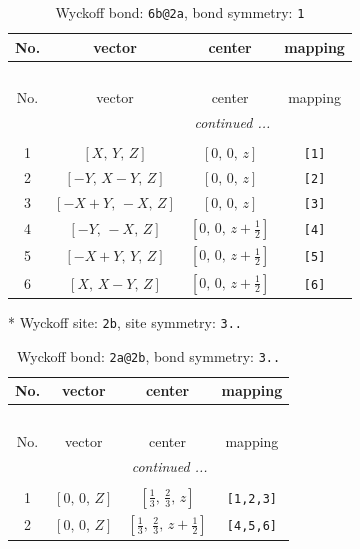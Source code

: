 \documentclass[fleqn,8pt]{jsarticle}
\begin{document}
\begin{longtable}{cccc}
\caption{Wyckoff bond: {\tt 6b@2a}, bond symmetry: {\tt 1}}
 \\
 \hline \hline
No. & vector & center & mapping \\ \hline \endfirsthead

\multicolumn{3}{l}{\tablename\ \thetable{}} \\
 \hline \hline
No. & vector & center & mapping \\ \hline \endhead

 \hline \hline
\multicolumn{3}{r}{\footnotesize\it continued ...} \\ \endfoot

 \hline \hline
\multicolumn{3}{r}{} \\ \endlastfoot

1 & $\left[ X,\, Y,\, Z \right]$ & $\left[ 0,\, 0,\, z \right]$ & {\tt [1]} \\ \hline
2 & $\left[ - Y,\, X - Y,\, Z \right]$ & $\left[ 0,\, 0,\, z \right]$ & {\tt [2]} \\ \hline
3 & $\left[ - X + Y,\, - X,\, Z \right]$ & $\left[ 0,\, 0,\, z \right]$ & {\tt [3]} \\ \hline
4 & $\left[ - Y,\, - X,\, Z \right]$ & $\left[ 0,\, 0,\, z + \frac{1}{2} \right]$ & {\tt [4]} \\ \hline
5 & $\left[ - X + Y,\, Y,\, Z \right]$ & $\left[ 0,\, 0,\, z + \frac{1}{2} \right]$ & {\tt [5]} \\ \hline
6 & $\left[ X,\, X - Y,\, Z \right]$ & $\left[ 0,\, 0,\, z + \frac{1}{2} \right]$ & {\tt [6]} \\
\end{longtable}
* Wyckoff site: {\tt 2b}, site symmetry: {\tt 3..}
\renewcommand{\arraystretch}{1.2}
\begin{longtable}{cccc}
\caption{Wyckoff bond: {\tt 2a@2b}, bond symmetry: {\tt 3..}}
 \\
 \hline \hline
No. & vector & center & mapping \\ \hline \endfirsthead

\multicolumn{3}{l}{\tablename\ \thetable{}} \\
 \hline \hline
No. & vector & center & mapping \\ \hline \endhead

 \hline \hline
\multicolumn{3}{r}{\footnotesize\it continued ...} \\ \endfoot

 \hline \hline
\multicolumn{3}{r}{} \\ \endlastfoot

1 & $\left[ 0,\, 0,\, Z \right]$ & $\left[ \frac{1}{3},\, \frac{2}{3},\, z \right]$ & {\tt [1,2,3]} \\ \hline
2 & $\left[ 0,\, 0,\, Z \right]$ & $\left[ \frac{1}{3},\, \frac{2}{3},\, z + \frac{1}{2} \right]$ & {\tt [4,5,6]} \\
\end{longtable}
\end{document}
